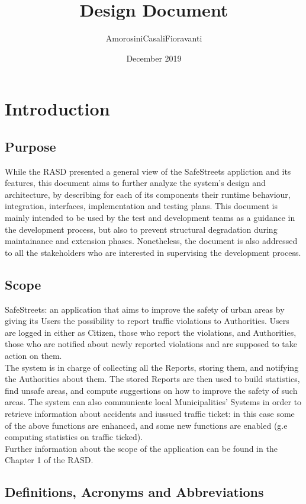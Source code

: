 \documentclass{report}
\title{Design Document}
\author{AmorosiniCasaliFioravanti}
\date{December 2019}
\begin{document}
\maketitle

\chapter{Introduction}
\section{Purpose}
While the RASD presented a general view of the SafeStreets appliction and its features, this document aims to further analyze the system's design and architecture, by describing for each of its components their runtime behaviour, integration, interfaces, implementation and testing plans.
This document is mainly intended to be used by the test and development teams as a guidance in the development process, but also to prevent structural degradation during maintainance and extension phases. Nonetheless, the document is also addressed to all the stakeholders who are interested in supervising the development process.

\section{Scope}
SafeStreets: an application that aims to improve the safety of urban areas by giving its Users the possibility to report traffic violations to Authorities. Users are logged in either as Citizen, those who report the violations, and Authorities, those who are notified about newly reported violations and are supposed to take action on them.\\
The system is in charge of collecting all the Reports, storing them, and notifying the Authorities about them. The stored Reports are then used to build statistics, find unsafe areas, and compute suggestions on how to improve the safety of such areas. The system can also communicate local Municipalities' Systems in order to retrieve information about accidents and iussued traffic ticket: in this case some of the above functions are enhanced, and some new functions are enabled (g.e computing statistics on traffic ticked).\\
\newline
Further information about the scope of the application can be found in the Chapter 1 of the RASD.

\section{Definitions, Acronyms and Abbreviations}
\end{document}
